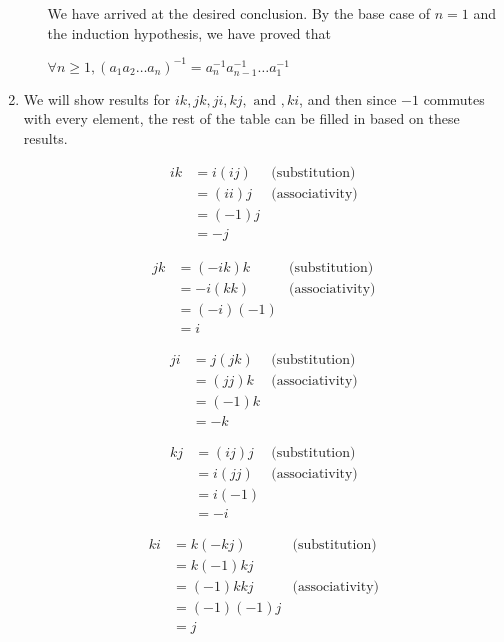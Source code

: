 \documentclass{article}
\begin{document}
\begin{enumerate}
\begin{enumerate}
            We have arrived at the desired conclusion. By the base case of $n=1$ and the induction hypothesis, we have proved that 
            
            $\forall n \geq 1, (a_1a_2\dots a_n)^{-1} = a_n^{-1}a_{n-1}^{-1}\dots a_1^{-1}$
        \end{enumerate}

    \item 
    We will show results for $ik, jk, ji, kj, \text{ and }, ki$, and then since $-1$ commutes with every element, the rest of the table can be filled in based on these results. 

    \begin{align*}
        ik &= i(ij) & \text{(substitution)} \\
        &= (ii)j & \text{(associativity)} \\
        &= (-1)j \\
        &= -j
    \end{align*}

    \begin{align*}
        jk &= (-ik)k & \text{(substitution)} \\
        &= -i(kk) & \text{(associativity)} \\
        &= (-i)(-1) \\
        &= i
    \end{align*}

    \begin{align*}
        ji &= j(jk) & \text{(substitution)} \\
        &= (jj)k & \text{(associativity)} \\
        &= (-1)k \\
        &= -k
    \end{align*}

    \begin{align*}
        kj &= (ij)j & \text{(substitution)} \\
        &= i(jj) & \text{(associativity)} \\
        &= i(-1) \\
        &= -i
    \end{align*}

    \begin{align*}
        ki &= k(-kj) & \text{(substitution)} \\
        &= k(-1)kj \\
        &= (-1)kkj & \text{(associativity)} \\
        &= (-1)(-1)j \\
        &= j
    \end{align*}


\end{enumerate}
\end{document}

